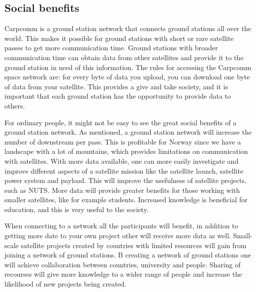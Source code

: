 \subsection{Social benefits}


Carpcomm is a ground station network that connects ground stations all over the world. This makes it possible for ground stations with short or rare satellite passes to get more communication time. Ground stations with broader communication time can obtain data from other satellites and provide it to the ground station in need of this information. The rules for accessing the Carpcomm space network are: for every byte of data you upload, you can download one byte of data from your satellite. This provides a give and take society, and it is important that each ground station has the opportunity to provide data to others. 

For ordinary people, it might not be easy to see the great social benefits of a ground station network. As mentioned, a ground station network will increase the number of downstream per pass. This is profitable for Norway since we have a landscape with a lot of mountains, which provides limitations on communication with satellites. With more data available, one can more easily investigate and improve different aspects of a satellite mission like the satellite launch, satellite power system and payload. This will improve the usefulness of satellite projects, such as NUTS. More data will provide greater benefits for those working with smaller satellites, like for example students. Increased knowledge is beneficial for education, and this is very useful to the society. 

When connecting to a network all the participants will benefit, in addition to getting more date to your own project other will receive more data as well. Small-scale satellite projects created by countries with limited resources will gain from joining a network of ground stations. B creating a network of ground stations one will achieve collaboration between countries, university and people. 
Sharing of recourses will give more knowledge to a wider range of people and increase the likelihood of new projects being created. 

